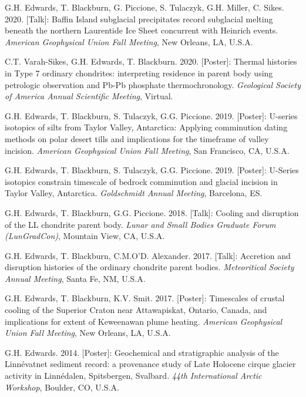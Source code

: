 \documentclass[10pt]{article}
\begin{document}
\begin{etaremune} [itemsep=4pt, leftmargin=3ex]
  \item G.H. Edwards, T. Blackburn, G. Piccione, S. Tulaczyk, G.H. Miller, C. Sikes. 2020. [Talk]: Baffin Island subglacial precipitates record subglacial melting beneath the northern Laurentide Ice Sheet concurrent with Heinrich events. \textit{American Geophysical Union Fall Meeting}, New Orleans, LA, U.S.A.
  \item C.T. Varah-Sikes, G.H. Edwards, T. Blackburn. 2020. [Poster]: Thermal histories in Type 7 ordinary chondrites: interpreting residence in parent body using petrologic observation and Pb-Pb phosphate thermochronology. \textit{Geological Society of America Annual Scientific Meeting}, Virtual.
  \item G.H. Edwards, T. Blackburn, S. Tulaczyk, G.G. Piccione. 2019. [Poster]: U-series isotopics of silts from Taylor Valley, Antarctica: Applying comminution dating methods on polar desert tills and implications for the timeframe of valley incision. \textit{American Geophysical Union Fall Meeting}, San Francisco, CA, U.S.A.
  \item  G.H. Edwards, T. Blackburn, S. Tulaczyk, G.G. Piccione. 2019. [Poster]: U-Series isotopics constrain timescale of bedrock comminution and glacial incision in Taylor Valley, Antarctica. \textit{Goldschmidt Annual Meeting}, Barcelona, ES.
	\item  G.H. Edwards, T. Blackburn, G.G. Piccione. 2018. [Talk]: Cooling and disruption of the LL chondrite parent body. \textit{Lunar and Small Bodies Graduate Forum (LunGradCon)}, Mountain View, CA, U.S.A.
  \item  G.H. Edwards, T. Blackburn, C.M.O’D. Alexander. 2017. [Talk]: Accretion and disruption histories of the ordinary chondrite parent bodies. \textit{Meteoritical Society Annual Meeting}, Santa Fe, NM, U.S.A.
  \item G.H. Edwards, T. Blackburn, K.V. Smit. 2017. [Poster]: Timescales of crustal cooling of the Superior Craton near Attawapiskat, Ontario, Canada, and implications for extent of Keweenawan plume heating. \textit{American Geophysical Union Fall Meeting}, New Orleans, LA, U.S.A.
  \item G.H. Edwards. 2014. [Poster]: Geochemical and stratigraphic analysis of the Linnévatnet sediment record: a provenance study of Late Holocene cirque glacier activity in Linnédalen, Spitsbergen, Svalbard. \textit{44th International Arctic Workshop}, Boulder, CO, U.S.A.
\end{etaremune}
\vspace{-12pt}
\end{document}
